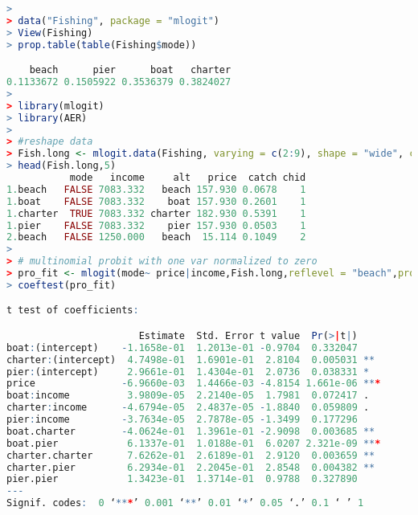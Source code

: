 \documentclass[cn]{elegantpaper}
\begin{document}
{\setmonofont{Lucida Console} 
\begin{lstlisting}[language=R]
> 
> data("Fishing", package = "mlogit")
> View(Fishing)
> prop.table(table(Fishing$mode))

    beach      pier      boat   charter 
0.1133672 0.1505922 0.3536379 0.3824027 
> 
> library(mlogit)
> library(AER)
> 
> #reshape data
> Fish.long <- mlogit.data(Fishing, varying = c(2:9), shape = "wide", choice = "mode")
> head(Fish.long,5)
           mode   income     alt   price  catch chid
1.beach   FALSE 7083.332   beach 157.930 0.0678    1
1.boat    FALSE 7083.332    boat 157.930 0.2601    1
1.charter  TRUE 7083.332 charter 182.930 0.5391    1
1.pier    FALSE 7083.332    pier 157.930 0.0503    1
2.beach   FALSE 1250.000   beach  15.114 0.1049    2
> 
> # multinomial probit with one var normalized to zero 
> pro_fit <- mlogit(mode~ price|income,Fish.long,reflevel = "beach",probit = TRUE)
> coeftest(pro_fit)

t test of coefficients:

                       Estimate  Std. Error t value  Pr(>|t|)    
boat:(intercept)    -1.1658e-01  1.2013e-01 -0.9704  0.332047    
charter:(intercept)  4.7498e-01  1.6901e-01  2.8104  0.005031 ** 
pier:(intercept)     2.9661e-01  1.4304e-01  2.0736  0.038331 *  
price               -6.9660e-03  1.4466e-03 -4.8154 1.661e-06 ***
boat:income          3.9809e-05  2.2140e-05  1.7981  0.072417 .  
charter:income      -4.6794e-05  2.4837e-05 -1.8840  0.059809 .  
pier:income         -3.7634e-05  2.7878e-05 -1.3499  0.177296    
boat.charter        -4.0624e-01  1.3961e-01 -2.9098  0.003685 ** 
boat.pier            6.1337e-01  1.0188e-01  6.0207 2.321e-09 ***
charter.charter      7.6262e-01  2.6189e-01  2.9120  0.003659 ** 
charter.pier         6.2934e-01  2.2045e-01  2.8548  0.004382 ** 
pier.pier            1.3423e-01  1.3714e-01  0.9788  0.327890    
---
Signif. codes:  0 ‘***’ 0.001 ‘**’ 0.01 ‘*’ 0.05 ‘.’ 0.1 ‘ ’ 1


\end{lstlisting}}
\end{document}
